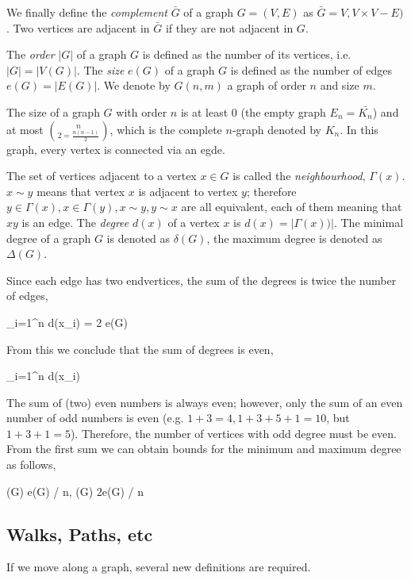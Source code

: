 We finally define the \emph{complement} $\bar{G}$ of a graph $G = (V,E)$ as $\bar{G} = V, V \times V - E)$. Two vertices are adjacent in $\bar{G}$ if they are not adjacent in $G$.

The \emph{order} $|G|$ of a graph $G$ is defined as the number of its vertices, i.e. $|G| = |V(G)|$. The \emph{size} $e(G)$ of a graph $G$ is defined as the number of edges $e(G) = |E(G)|$. We denote by $G(n,m)$ a graph of order $n$ and size $m$.

The size of a graph $G$ with order $n$ is at least $0$ (the empty graph $E_n = \bar{K_n}$) and at most ${n} \choose {2} = \frac{n(n-1)}{2}$, which is the complete $n$-graph denoted by $K_n$. In this graph, every vertex is connected via an egde.

The set of vertices adjacent to a vertex $x \in G$ is called the \emph{neighbourhood}, $\Gamma(x)$. $x \sim y$ means that vertex $x$ is adjacent to vertex $y$; therefore $y \in \Gamma(x), x \in \Gamma(y), x \sim y, y \sim x$ are all equivalent, each of them meaning that $xy$ is an edge. The \emph{degree} $d(x)$ of a vertex $x$ is $d(x) = |\Gamma(x))|$. The minimal degree of a graph $G$ is denoted as $\delta(G)$, the maximum degree is denoted as $\Delta(G)$.

Since each edge has two endvertices, the sum of the degrees is twice the number of edges,

\be\label{eq:graph_03:01}
\sum_{i=1}^n d(x_i) = 2 e(G)
\ee

From this we conclude that the sum of degrees is even,

\bee
\sum_{i=1}^n d(x_i)  
\eee

The sum of (two) even numbers is always even; however, only the sum of an even number of odd numbers is even (e.g. $1+3=4, 1+3+5+1 = 10$, but $1+3+1 = 5$). Therefore, the number of vertices with odd degree must be even. From the first sum we can obtain bounds for the minimum and maximum degree as follows,

\bee
\delta(G)  e(G) / n, \quad \Delta (G) \geq 2e(G) / n
\eee


\subsection{Walks, Paths, etc}

If we move along a graph, several new definitions are required.

